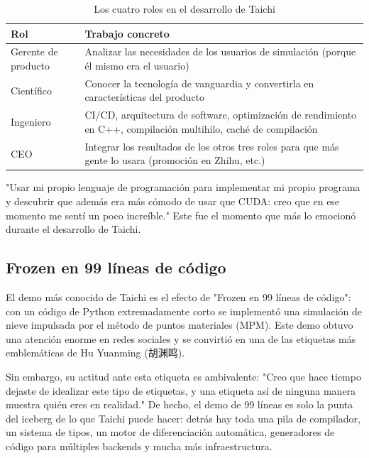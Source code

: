 \documentclass[a4paper]{article}
\begin{document}
\begin{table}[H]
\centering
\caption{Los cuatro roles en el desarrollo de Taichi}
\begin{tabular}{ll}
\toprule
\textbf{Rol} & \textbf{Trabajo concreto} \\
\midrule
Gerente de producto & Analizar las necesidades de los usuarios de simulación (porque él mismo era el usuario) \\
Científico & Conocer la tecnología de vanguardia y convertirla en características del producto \\
Ingeniero & CI/CD, arquitectura de software, optimización de rendimiento en C++, compilación multihilo, caché de compilación \\
CEO & Integrar los resultados de los otros tres roles para que más gente lo usara (promoción en Zhihu, etc.) \\
\bottomrule
\end{tabular}
\end{table}

"Usar mi propio lenguaje de programación para implementar mi propio programa y descubrir que además era más cómodo de usar que CUDA: creo que en ese momento me sentí un poco increíble." Este fue el momento que más lo emocionó durante el desarrollo de Taichi.

\subsection{Frozen en 99 líneas de código}

El demo más conocido de Taichi es el efecto de "Frozen en 99 líneas de código": con un código de Python extremadamente corto se implementó una simulación de nieve impulsada por el método de puntos materiales (MPM). Este demo obtuvo una atención enorme en redes sociales y se convirtió en una de las etiquetas más emblemáticas de Hu Yuanming (胡渊鸣).

Sin embargo, su actitud ante esta etiqueta es ambivalente: "Creo que hace tiempo dejaste de idealizar este tipo de etiquetas, y una etiqueta así de ninguna manera muestra quién eres en realidad." De hecho, el demo de 99 líneas es solo la punta del iceberg de lo que Taichi puede hacer: detrás hay toda una pila de compilador, un sistema de tipos, un motor de diferenciación automática, generadores de código para múltiples backends y mucha más infraestructura.
\end{document}

